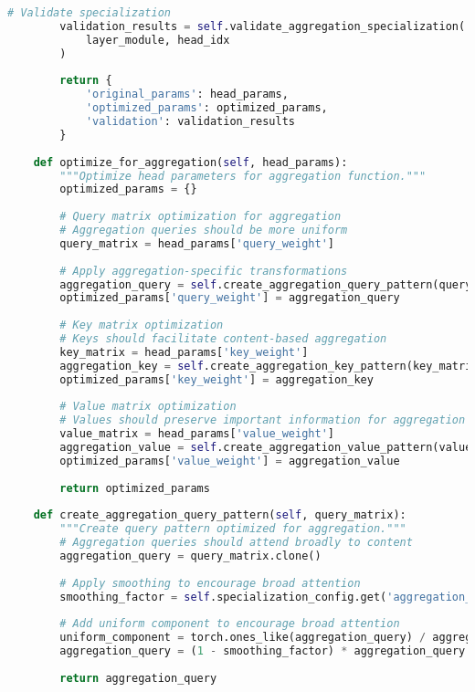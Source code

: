 \begin{lstlisting}[language=Python, caption=Attention pattern analysis and optimization framework]
        # Validate specialization
        validation_results = self.validate_aggregation_specialization(
            layer_module, head_idx
        )
        
        return {
            'original_params': head_params,
            'optimized_params': optimized_params,
            'validation': validation_results
        }
    
    def optimize_for_aggregation(self, head_params):
        """Optimize head parameters for aggregation function."""
        optimized_params = {}
        
        # Query matrix optimization for aggregation
        # Aggregation queries should be more uniform
        query_matrix = head_params['query_weight']
        
        # Apply aggregation-specific transformations
        aggregation_query = self.create_aggregation_query_pattern(query_matrix)
        optimized_params['query_weight'] = aggregation_query
        
        # Key matrix optimization
        # Keys should facilitate content-based aggregation
        key_matrix = head_params['key_weight']
        aggregation_key = self.create_aggregation_key_pattern(key_matrix)
        optimized_params['key_weight'] = aggregation_key
        
        # Value matrix optimization
        # Values should preserve important information for aggregation
        value_matrix = head_params['value_weight']
        aggregation_value = self.create_aggregation_value_pattern(value_matrix)
        optimized_params['value_weight'] = aggregation_value
        
        return optimized_params
    
    def create_aggregation_query_pattern(self, query_matrix):
        """Create query pattern optimized for aggregation."""
        # Aggregation queries should attend broadly to content
        aggregation_query = query_matrix.clone()
        
        # Apply smoothing to encourage broad attention
        smoothing_factor = self.specialization_config.get('aggregation_smoothing', 0.1)
        
        # Add uniform component to encourage broad attention
        uniform_component = torch.ones_like(aggregation_query) / aggregation_query.size(-1)
        aggregation_query = (1 - smoothing_factor) * aggregation_query + smoothing_factor * uniform_component
        
        return aggregation_query


\end{lstlisting}
